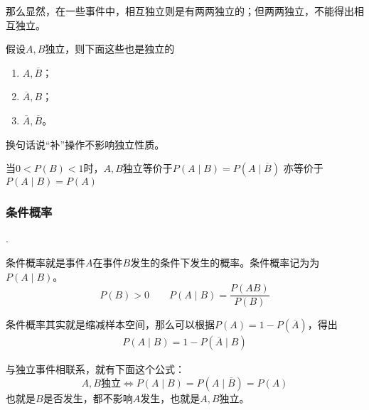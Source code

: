 那么显然，在一些事件中，相互独立则是有两两独立的；但两两独立，不能得出相互独立。

\begin{property}
    假设$A,B$独立，则下面这些也是独立的
    \begin{enumerate}[(1)]
        \item $A,\overline{B}$；
        \item $\overline{A},B$；
        \item $\overline{A},\overline{B}$。
    \end{enumerate}
\end{property}
换句话说“补”操作不影响独立性质。

\begin{property}
    当$0<P(B)<1$时，$A,B$独立等价于$P(A \mid B) = P(A \mid \overline{B})$
    亦等价于$P(A\mid B) = P(A)$
\end{property}

\subsubsection{条件概率}
.
\begin{definition}
    条件概率就是事件$A$在事件$B$发生的条件下发生的概率。条件概率记为为$P(A\mid B)$。
    \[ P(B)>0\qquad P(A\mid B) = \frac{P(AB)}{P(B)} \]
\end{definition}

条件概率其实就是缩减样本空间，那么可以根据$P(A)=1-P(\overline{A})$，得出
\begin{eqnarray}
    P(A\mid B) = 1 - P(\overline{A}\mid B)
\end{eqnarray}

与独立事件相联系，就有下面这个公式：
\begin{equation}
    A,B\text{独立} \iff P(A\mid B) = P(A\mid \overline{B}) = P(A)
\end{equation}
也就是$B$是否发生，都不影响$A$发生，也就是$A,B$独立。

